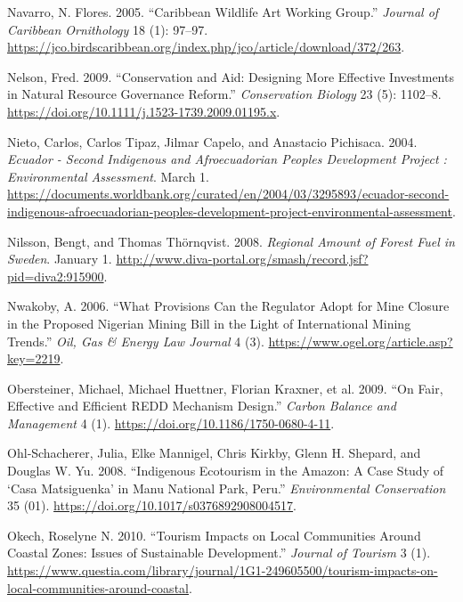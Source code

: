 \begin{CSLReferences}{1}{1}
Navarro, N. Flores. 2005. {``Caribbean Wildlife Art Working Group.''}
\emph{Journal of Caribbean Ornithology} 18 (1): 97--97.
\url{https://jco.birdscaribbean.org/index.php/jco/article/download/372/263}.

Nelson, Fred. 2009. {``Conservation and Aid: Designing More Effective
Investments in Natural Resource Governance Reform.''} \emph{Conservation
Biology} 23 (5): 1102--8.
\url{https://doi.org/10.1111/j.1523-1739.2009.01195.x}.

Nieto, Carlos, Carlos Tipaz, Jilmar Capelo, and Anastacio Pichisaca.
2004. \emph{Ecuador - Second Indigenous and Afroecuadorian Peoples
Development Project : Environmental Assessment}. March 1.
\url{https://documents.worldbank.org/curated/en/2004/03/3295893/ecuador-second-indigenous-afroecuadorian-peoples-development-project-environmental-assessment}.

Nilsson, Bengt, and Thomas Thörnqvist. 2008. \emph{Regional Amount of
Forest Fuel in Sweden}. January 1.
\url{http://www.diva-portal.org/smash/record.jsf?pid=diva2:915900}.

Nwakoby, A. 2006. {``What Provisions Can the Regulator Adopt for Mine
Closure in the Proposed Nigerian Mining Bill in the Light of
International Mining Trends.''} \emph{Oil, Gas \& Energy Law Journal} 4
(3). \url{https://www.ogel.org/article.asp?key=2219}.

Obersteiner, Michael, Michael Huettner, Florian Kraxner, et al. 2009.
{``On Fair, Effective and Efficient REDD Mechanism Design.''}
\emph{Carbon Balance and Management} 4 (1).
\url{https://doi.org/10.1186/1750-0680-4-11}.

Ohl‐Schacherer, Julia, Elke Mannigel, Chris Kirkby, Glenn H. Shepard,
and Douglas W. Yu. 2008. {``Indigenous Ecotourism in the Amazon: A Case
Study of {`Casa Matsiguenka'} in Manu National Park, Peru.''}
\emph{Environmental Conservation} 35 (01).
\url{https://doi.org/10.1017/s0376892908004517}.

Okech, Roselyne N. 2010. {``Tourism Impacts on Local Communities Around
Coastal Zones: Issues of Sustainable Development.''} \emph{Journal of
Tourism} 3 (1).
\url{https://www.questia.com/library/journal/1G1-249605500/tourism-impacts-on-local-communities-around-coastal}.


\end{CSLReferences}
